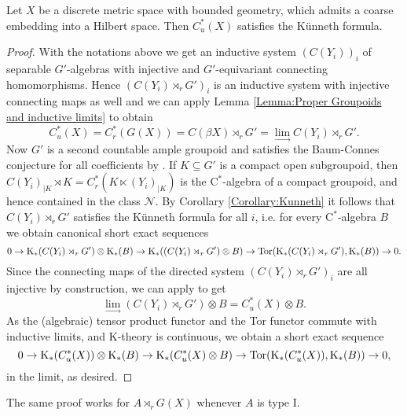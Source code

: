 \begin{satz}
		Let $X$ be a discrete metric space with bounded geometry, which admits a coarse embedding into a Hilbert space. Then $C_u^*(X)$ satisfies the Künneth formula.
	\end{satz}
	\begin{proof}
		With the notations above we get an inductive system $(C(Y_i))_i$ of separable $G'$-algebras with injective and $G'$-equivariant connecting homomorphisms. Hence $(C(Y_i)\rtimes_r G')_i$ is an inductive system with injective connecting maps as well and we can apply Lemma \ref{Lemma:Proper Groupoids and inductive limits} to obtain
		$$C_u^*(X)=C_r^*(G(X))=C(\beta X)\rtimes_r G'=\lim\limits_{\longrightarrow} C(Y_i)\rtimes_r G'.$$
		Now $G'$ is a second countable ample groupoid and satisfies the Baum-Connes conjecture for all coefficients by \cite{Tu98}. If $K\subseteq G'$ is a compact open subgroupoid, then $C(Y_i)_{\mid K}\rtimes K=C_r^*(K\ltimes(Y_i)_{\mid K})$ is the $\mathrm{C}^*$-algebra of a compact groupoid, and hence contained in the class $\mathcal{N}$. By Corollary \ref{Corollary:Kunneth} it follows that $C(Y_i)\rtimes_r G'$ satisfies the Künneth formula for all $i$, i.e. for every $\mathrm{C}^*$-algebra $B$ we obtain canonical short exact sequences
		$$0\rightarrow \mathrm K_*(C(Y_i)\rtimes_r G')\otimes \mathrm K_*(B)\rightarrow \mathrm K_*((C(Y_i)\rtimes_r G')\otimes B)\rightarrow \mathrm{Tor}(\mathrm K_*(C(Y_i)\rtimes_r G'),\mathrm K_*(B))\rightarrow 0.$$
		Since the connecting maps of the directed system $(C(Y_i)\rtimes_r G')_i$ are all injective by construction, we can apply \cite[II.9.6.6]{MR2188261} to get $$\lim\limits_{\longrightarrow}(C(Y_i)\rtimes_r G')\otimes B=C_u^*(X)\otimes B.$$
		As the (algebraic) tensor product functor and the Tor functor commute with inductive limits, and $\mathrm{K}$-theory is continuous, we obtain a short exact sequence
		$$0\rightarrow \mathrm K_*(C_u^*(X))\otimes \mathrm K_*(B)\rightarrow \mathrm K_*(C_u^*(X)\otimes B)\rightarrow \mathrm{Tor}(\mathrm K_*(C_u^*(X)),\mathrm K_*(B))\rightarrow 0,$$
		in the limit, as desired.
	\end{proof}
	The same proof works for $A\rtimes_r G(X)$ whenever $A$ is type I.

